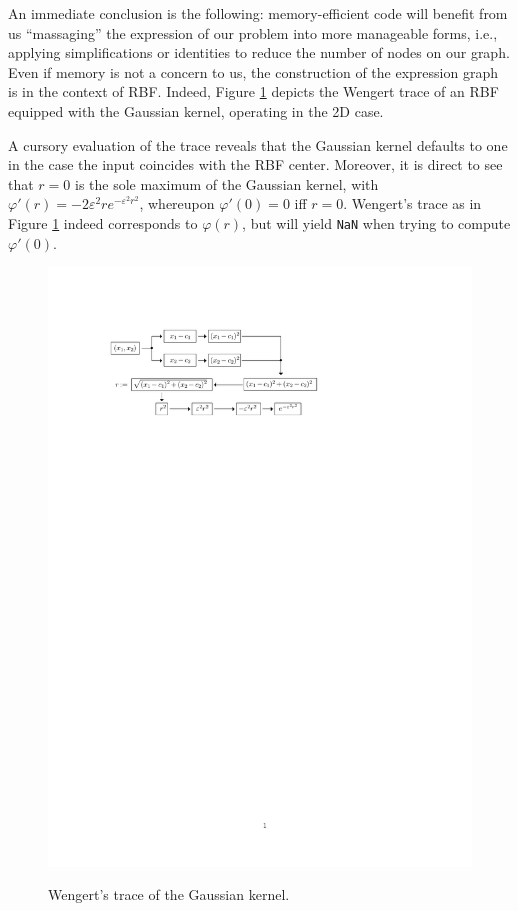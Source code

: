\documentclass[12pt]{report} %
\begin{document}
An immediate conclusion is the following: memory-efficient code will benefit from us
``massaging'' the expression of our problem into more manageable forms, i.e., applying
simplifications or identities to reduce the number of nodes on our graph.
Even if memory is not a concern to us, the construction of the expression graph is
in the context of RBF. Indeed, Figure \ref{fig:wenger-trace-gaussian}
depicts the Wengert trace of an RBF equipped with the Gaussian kernel, operating in the 2D
case.

A cursory evaluation of the trace reveals that the Gaussian kernel defaults to one in
the case the input coincides with the RBF center. Moreover, it is direct to see that
$r=0$ is the sole maximum of the Gaussian kernel, with $\varphi'(r)=-2 \varepsilon^2 r
  e^{-\varepsilon^2 r^2}$, whereupon $\varphi'(0)=0$ iff $r=0$. Wengert's trace as in Figure \ref{fig:wenger-trace-gaussian}
indeed corresponds to $\varphi(r)$, but will yield \texttt{NaN} when trying to compute
$\varphi'(0)$.

\begin{figure}[ht]
  {\includegraphics[width=.85\textwidth, trim={2cm 22cm 7cm 3cm}, clip=true]{imagenes/rbf_discussion/diagrama-gaussian-wengert.pdf}}
  \caption{Wengert's trace of the Gaussian kernel.}
  \label{fig:wenger-trace-gaussian}
\end{figure}
\end{document}
